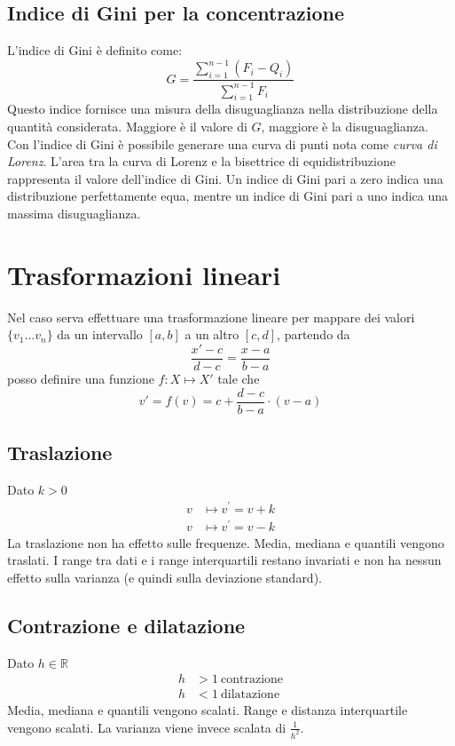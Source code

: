 \documentclass[11pt]{report}
\begin{document}
\subsection{Indice di Gini per la concentrazione}
L'indice di Gini è definito come:
\begin{equation}
    G = \frac{\sum_{i=1}^{n-1} (F_i - Q_i)}{\sum_{i=1}^{n-1} F_i}
\end{equation}
Questo indice fornisce una misura della disuguaglianza nella distribuzione della quantità considerata. Maggiore è il valore di \(G\), maggiore è la disuguaglianza.
Con l'indice di Gini è possibile generare una curva di punti nota come \textit{curva di Lorenz}. L'area tra la curva di Lorenz e la bisettrice di equidistribuzione rappresenta il valore dell'indice di Gini. Un indice di Gini pari a zero indica una distribuzione perfettamente equa, mentre un indice di Gini pari a uno indica una massima disuguaglianza.

\section{Trasformazioni lineari}
Nel caso serva effettuare una trasformazione lineare per mappare dei valori $\{v_1\dots v_n\}$ da un intervallo $[a,b]$ a un altro $[c,d]$, partendo da
\begin{equation}
    \frac{x'-c}{d-c} = \frac{x-a}{b-a}
\end{equation}
posso definire una funzione $f:X\mapsto X'$ tale che
\begin{equation}
    v' = f(v) = c + \frac{d-c}{b-a}\cdot (v-a)
\end{equation}
\subsection{Traslazione}
Dato $k > 0$
\begin{equation}
    \begin{split}
        v & \mapsto v^{\prime} = v + k\\
        v & \mapsto v^{\prime} = v - k
    \end{split}
\end{equation}
La traslazione non ha effetto sulle frequenze. Media, mediana e quantili vengono traslati. I range tra dati e i range interquartili restano invariati e non ha nessun effetto sulla varianza (e quindi sulla deviazione standard).
\subsection{Contrazione e dilatazione}
Dato $h \in \mathbb{R}$
\begin{equation}
    \begin{split}
        h & > 1\ \text{contrazione}\\
        h & < 1\ \text{dilatazione}
    \end{split}
\end{equation}
Media, mediana e quantili vengono scalati. Range e distanza interquartile vengono scalati. La varianza viene invece scalata di $\frac{1}{h^2}$.
\end{document}
